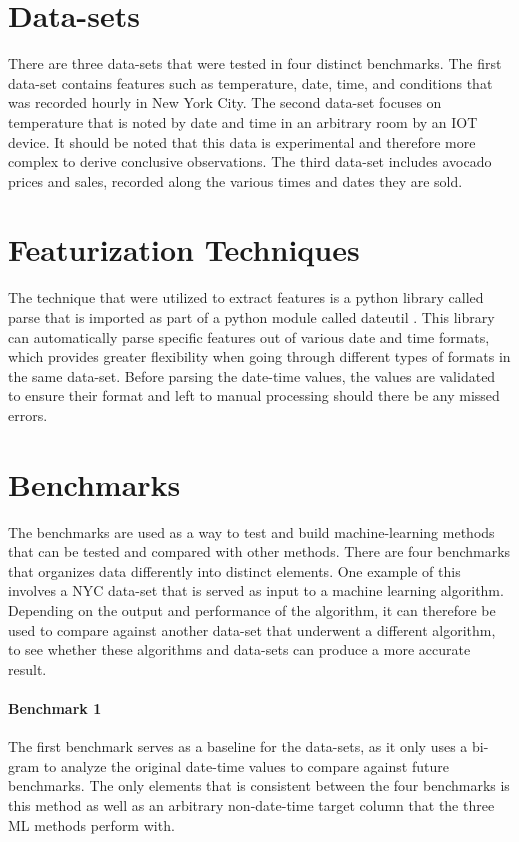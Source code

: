 \documentclass{article}
\begin{document}
\section{Data-sets}
There are three data-sets that were tested in four distinct benchmarks. The first data-set contains features such as temperature, date, time, and conditions that was recorded hourly in New York City. The second data-set focuses on temperature that is noted by date and time in an arbitrary room by an IOT device. It should be noted that this data is experimental and therefore more complex to derive conclusive observations. The third data-set includes avocado prices and sales, recorded along the various times and dates they are sold. 

\section{Featurization Techniques}
The technique that were utilized to extract features is a python library called parse that is imported as part of a python module called dateutil \cite{dateutil}. This library can automatically parse specific features out of various date and time formats, which provides greater flexibility when going through different types of formats in the same data-set. Before parsing the date-time values, the values are validated to ensure their format and left to manual processing should there be any missed errors.

\section{Benchmarks}
The benchmarks are used as a way to test and build machine-learning methods that can be tested and compared with other methods. There are four benchmarks that organizes data differently into distinct elements. One example of this involves a NYC data-set that is served as input to a machine learning algorithm. Depending on the output and performance of the algorithm, it can therefore be used to compare against another data-set that underwent a different algorithm, to see whether these algorithms and data-sets can produce a more accurate result.

\paragraph{Benchmark 1}
The first benchmark serves as a baseline for the data-sets, as it only uses a bi-gram to analyze the original date-time values to compare against future benchmarks. The only elements that is consistent between the four benchmarks is this method as well as an arbitrary non-date-time target column that the three ML methods perform with. 
\end{document}
